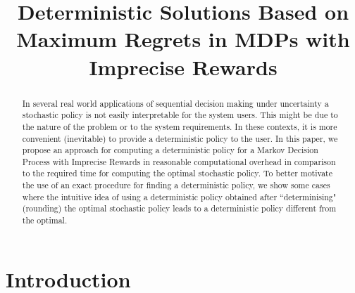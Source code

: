 \documentclass[sigconf]{aamas}  %
\begin{document}
\title{Deterministic Solutions Based on Maximum Regrets in MDPs with Imprecise Rewards}


\begin{abstract}  %
In several real world applications of sequential decision making under uncertainty a stochastic policy is not easily interpretable for the system users. This might be due to the nature of the problem or to the system requirements. In these contexts, it is more convenient (inevitable) to provide a deterministic policy to the user. In this paper, we propose an approach for computing a deterministic policy for a Markov Decision Process with Imprecise Rewards in reasonable computational overhead in comparison to the required time for computing the optimal stochastic policy. To better motivate the use of an exact procedure for finding a deterministic policy, we show some cases where the intuitive idea of using a deterministic policy obtained after ``determinising" (rounding) the optimal stochastic policy leads to a deterministic policy different from the optimal.
\end{abstract}



\maketitle



\section{Introduction}


\end{document}
